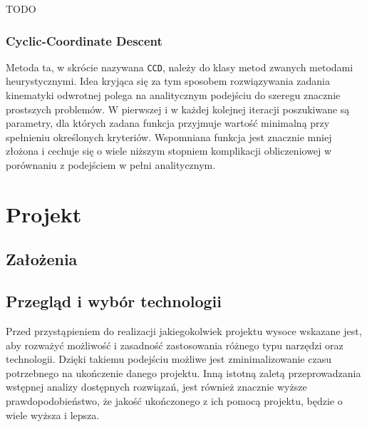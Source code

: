 \documentclass[11pt]{mwrep}
\begin{document}
     TODO
 
    \subsection{Cyclic-Coordinate Descent}
  Metoda ta, w skrócie nazywana \texttt{CCD}, należy do klasy metod zwanych metodami heurystycznymi. Idea kryjąca się za tym sposobem rozwiązywania zadania kinematyki odwrotnej polega na analitycznym podejściu do szeregu znacznie prostszych problemów. W pierwszej i w każdej kolejnej iteracji poszukiwane są parametry, dla których zadana funkcja przyjmuje wartość minimalną przy spełnieniu określonych kryteriów. Wspomniana funkcja jest znacznie mniej złożona i cechuje się o wiele niższym stopniem komplikacji obliczeniowej w porównaniu z podejściem w pełni analitycznym.


\chapter{Projekt}

  \section{Założenia}

  \section{Przegląd i wybór technologii}
    Przed przystąpieniem do realizacji jakiegokolwiek projektu wysoce wskazane jest, aby rozważyć możliwość i zasadność zastosowania różnego typu narzędzi oraz technologii. Dzięki takiemu podejściu możliwe jest zminimalizowanie czasu potrzebnego na ukończenie danego projektu. Inną istotną zaletą przeprowadzania wstępnej analizy dostępnych rozwiązań, jest również znacznie wyższe prawdopodobieństwo, że jakość ukończonego z ich pomocą projektu, będzie o wiele wyższa i lepsza.
  
\end{document}
